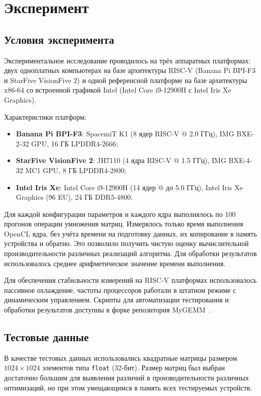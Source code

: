 
\section{Эксперимент}

\subsection{Условия эксперимента}

Экспериментальное исследование проводилось на трёх аппаратных платформах: двух одноплатных компьютерах на базе архитектуры RISC-V (Banana Pi BPI-F3 и StarFive VisionFive 2) и одной референсной платформе на базе архитектуры x86-64 со встроенной графикой Intel (Intel Core i9-12900H с Intel Iris Xe Graphics).

Характеристики платформ:
\begin{itemize}
    \item \textbf{Banana Pi BPI-F3}: SpacemiT K1 (8 ядер RISC-V @ 2.0 ГГц), IMG BXE-2-32 GPU, 16 ГБ LPDDR4-2666;
    \item \textbf{StarFive VisionFive 2}: JH7110 (4 ядра RISC-V @ 1.5 ГГц), IMG BXE-4-32 MC1 GPU, 8 ГБ LPDDR4-2800;
    \item \textbf{Intel Iris Xe}: Intel Core i9-12900H (14 ядер @ до 5.0 ГГц), Intel Iris Xe Graphics (96 EU), 24 ГБ DDR5-4800.
\end{itemize}

Для каждой конфигурации параметров и каждого ядра выполнялось по 100 прогонов операции умножения матриц. Измерялось только время выполнения OpenCL ядра, без учёта времени на подготовку данных, их копирование в память устройства и обратно. Это позволило получить чистую оценку вычислительной производительности различных реализаций алгоритма. Для обработки результатов использовалось среднее арифметическое значение времени выполнения.

Для обеспечения стабильности измерений на RISC-V платформах использовалось пассивное охлаждение, частоты процессоров работали в штатном режиме с динамическим управлением. Скрипты для автоматизации тестирования и обработки результатов доступны в форке репозитория MyGEMM~\cite{mygemm_repo_test}.

\subsection{Тестовые данные}

В качестве тестовых данных использовались квадратные матрицы размером $1024 \times 1024$ элементов типа \texttt{float} (32-бит). Размер матриц был выбран достаточно большим для выявления различий в производительности различных оптимизаций, но при этом умещающимся в память всех тестируемых устройств.

